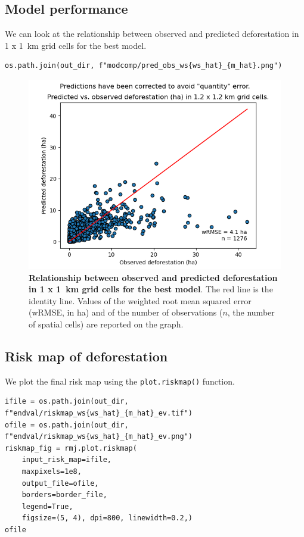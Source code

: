 \documentclass[paper=a4, 12pt, DIV=12]{scrartcl}
\begin{document}
\subsection{Model performance}
\label{sec:org9130cca}

We can look at the relationship between observed and predicted deforestation in 1 x 1 km grid cells for the best model.

\begin{verbatim}
os.path.join(out_dir, f"modcomp/pred_obs_ws{ws_hat}_{m_hat}.png")
\end{verbatim}

\begin{figure}[H]
\centering
\includegraphics[width=0.8\linewidth]{outputs/modcomp/pred_obs_ws5_ei.png}
\caption{\label{fig:orga1dc148}\textbf{Relationship between observed and predicted deforestation in 1 x 1 km grid cells for the best model}. The red line is the identity line. Values of the weighted root mean squared error (wRMSE, in ha) and of the number of observations (\(n\), the number of spatial cells) are reported on the graph.}
\end{figure}

\subsection{Risk map of deforestation}
\label{sec:orgd91bab2}

We plot the final risk map using the \texttt{plot.riskmap()} function.

\begin{verbatim}
ifile = os.path.join(out_dir, f"endval/riskmap_ws{ws_hat}_{m_hat}_ev.tif")
ofile = os.path.join(out_dir, f"endval/riskmap_ws{ws_hat}_{m_hat}_ev.png")
riskmap_fig = rmj.plot.riskmap(
    input_risk_map=ifile,
    maxpixels=1e8,
    output_file=ofile,
    borders=border_file,
    legend=True,
    figsize=(5, 4), dpi=800, linewidth=0.2,)
ofile
\end{verbatim}
\end{document}

